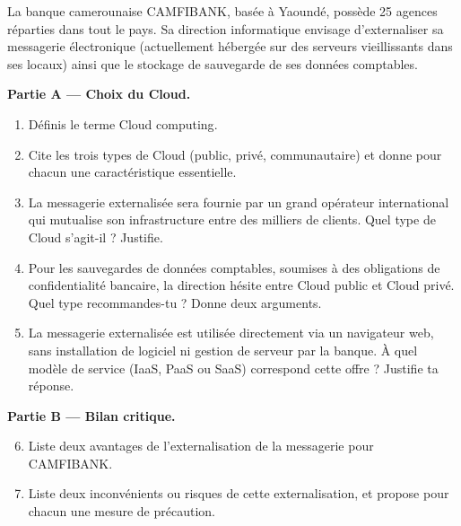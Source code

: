 \documentclass[11pt]{article}
\newcommand{\cle}[1]{{\popxbold\color{popdark}#1}}
\newcounter{popsec}
\newcounter{popsub}
\newcommand{\courssub}[1]{%
  \stepcounter{popsub}%
  \par\vspace{9pt}\noindent{\popxbold\fontsize{11.5}{13}\selectfont\color{popink}{\color{poporange}\thepopsec.\thepopsub}\hspace{6pt}#1}\par\nopagebreak\vspace{4pt}
}
\begin{document}
\courssub{Je me prépare au Bac}

\begin{exercice}
La banque camerounaise CAMFIBANK, basée à Yaoundé, possède 25 agences réparties dans tout le pays. Sa direction informatique envisage d'externaliser sa messagerie électronique (actuellement hébergée sur des serveurs vieillissants dans ses locaux) ainsi que le stockage de sauvegarde de ses données comptables.

\textbf{Partie A — Choix du Cloud.}
\begin{enumerate}
    \item Définis le terme \cle{Cloud computing}.
    \item Cite les trois types de Cloud (public, privé, communautaire) et donne pour chacun une caractéristique essentielle.
    \item La messagerie externalisée sera fournie par un grand opérateur international qui mutualise son infrastructure entre des milliers de clients. Quel type de Cloud s'agit-il ? Justifie.
    \item Pour les sauvegardes de données comptables, soumises à des obligations de confidentialité bancaire, la direction hésite entre Cloud public et Cloud privé. Quel type recommandes-tu ? Donne deux arguments.
    \item La messagerie externalisée est utilisée directement via un navigateur web, sans installation de logiciel ni gestion de serveur par la banque. À quel modèle de service (IaaS, PaaS ou SaaS) correspond cette offre ? Justifie ta réponse.
\end{enumerate}

\textbf{Partie B — Bilan critique.}
\begin{enumerate}
    \setcounter{enumi}{5}
    \item Liste deux avantages de l'externalisation de la messagerie pour CAMFIBANK.
    \item Liste deux inconvénients ou risques de cette externalisation, et propose pour chacun une mesure de précaution.
\end{enumerate}
\end{exercice}
\end{document}
